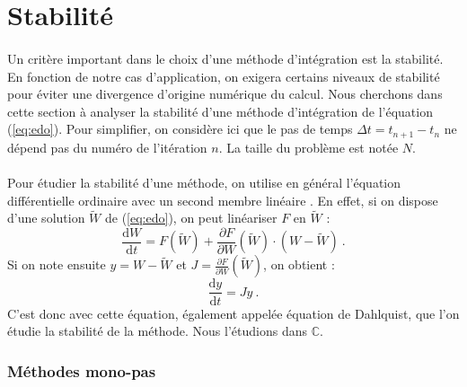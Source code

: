   \section{Stabilité}

    \paragraph{}
    Un critère important dans le choix d'une méthode d'intégration est la stabilité.
    En fonction de notre cas d'application, on exigera certains niveaux de stabilité pour éviter une divergence d'origine numérique du calcul.
    Nous cherchons dans cette section à analyser la stabilité d'une méthode d'intégration de l'équation (\ref{eq:edo}).
    Pour simplifier, on considère ici que le pas de temps $\Delta t = t_{n+1} - t_n$ ne dépend pas du numéro de l'itération $n$.
    La taille du problème est notée $N$.

    \paragraph{}
    Pour étudier la stabilité d'une méthode, on utilise en général l'équation différentielle ordinaire avec un second membre linéaire \cite{HairerWanner1996}.
    En effet, si on dispose d'une solution $\tilde{W}$ de (\ref{eq:edo}), on peut linéariser $F$ en $\tilde{W}$ :
    \[\frac{\mathrm{d}W}{\mathrm{d}t} = F\left(\tilde{W}\right) + \frac{\partial F}{\partial W}\left(\tilde{W}\right)\cdot\left(W - \tilde{W}\right)\ .\]
    Si on note ensuite $y = W - \tilde{W}$ et $J = \frac{\partial F}{\partial W}\left(\tilde{W}\right)$, on obtient :
    \begin{equation}\label{eq:stab}
      \frac{\mathrm{d}y}{\mathrm{d}t} = Jy\ .
    \end{equation}
    C'est donc avec cette équation, également appelée équation de Dahlquist, que l'on étudie la stabilité de la méthode.
    Nous l'étudions dans $\mathbb{C}$.


    \subsubsection{Méthodes mono-pas}

